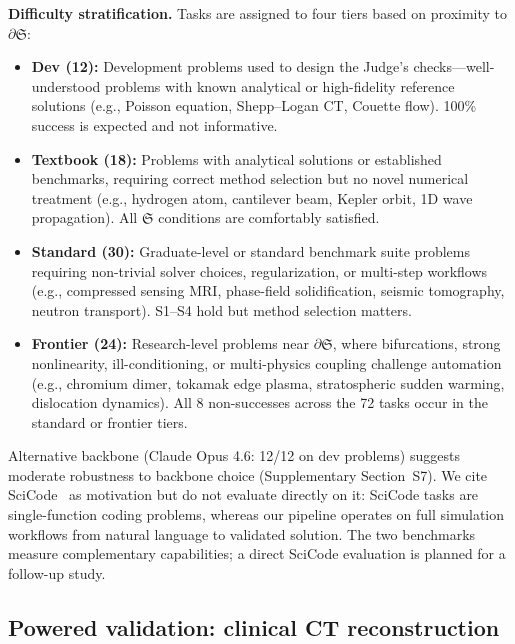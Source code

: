 \documentclass[11pt,a4paper]{article}
\newcommand{\Sclass}{\mathfrak{S}}
\begin{document}
\textbf{Difficulty stratification.} Tasks are assigned to four tiers based on proximity to $\partial \Sclass$:
\begin{itemize}[nosep]
\item \textbf{Dev (12):} Development problems used to design the Judge's checks---well-understood problems with known analytical or high-fidelity reference solutions (e.g., Poisson equation, Shepp--Logan CT, Couette flow). 100\% success is expected and not informative.
\item \textbf{Textbook (18):} Problems with analytical solutions or established benchmarks, requiring correct method selection but no novel numerical treatment (e.g., hydrogen atom, cantilever beam, Kepler orbit, 1D wave propagation). All $\Sclass$ conditions are comfortably satisfied.
\item \textbf{Standard (30):} Graduate-level or standard benchmark suite problems requiring non-trivial solver choices, regularization, or multi-step workflows (e.g., compressed sensing MRI, phase-field solidification, seismic tomography, neutron transport). S1--S4 hold but method selection matters.
\item \textbf{Frontier (24):} Research-level problems near $\partial \Sclass$, where bifurcations, strong nonlinearity, ill-conditioning, or multi-physics coupling challenge automation (e.g., chromium dimer, tokamak edge plasma, stratospheric sudden warming, dislocation dynamics). All 8 non-successes across the 72 tasks occur in the standard or frontier tiers.
\end{itemize}

Alternative backbone (Claude Opus 4.6: 12/12 on dev problems) suggests moderate robustness to backbone choice (Supplementary Section~S7). We cite SciCode~\cite{tian2024scicode} as motivation but do not evaluate directly on it: SciCode tasks are single-function coding problems, whereas our pipeline operates on full simulation workflows from natural language to validated solution. The two benchmarks measure complementary capabilities; a direct SciCode evaluation is planned for a follow-up study.

\subsection{Powered validation: clinical CT reconstruction}
\label{sec:ct}
\end{document}
